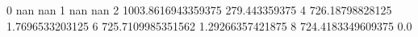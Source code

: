 0 nan nan
1 nan nan
2 1003.8616943359375 279.443359375
4 726.18798828125 1.7696533203125
6 725.7109985351562 1.29266357421875
8 724.4183349609375 0.0
